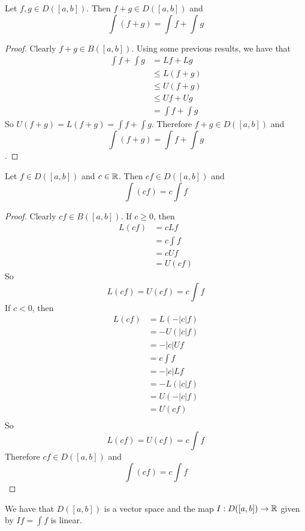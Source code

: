 \documentclass{book}
\begin{document}
	\begin{ex}  
		Let $f, g \in D([a,b])$. Then $f+g \in D([a,b])$ and $$\int (f+g) = \int f + \int g$$
	\end{ex}
	
	\begin{proof}
		Clearly $f+g \in B([a,b])$. Using some previous results, we have that 
		\begin{align*}
			\int f + \int g 
			&= Lf + Lg \\
			&\leq L(f+g) \\
			&\leq U(f+g) \\
			&\leq Uf + Ug \\
			&= \int f + \int g
		\end{align*}
		So $U(f+g) = L(f+g) = \int f + \int g$. Therefore $f+g \in D([a,b])$ and $$\int (f+g) = \int f + \int g$$.
	\end{proof}

	\begin{ex}  
		Let $f \in D([a,b])$ and $c \in \mathbb{R}$. Then $cf \in D([a,b])$ and $$\int (cf) = c \int f $$
	\end{ex}

	\begin{proof}
		Clearly $cf \in B([a,b])$. If $c \geq 0$, then 
		\begin{align*}
			L (cf) 
			&= c Lf \\
			&= c \int f \\
			&= c Uf \\
			&= U(cf)
		\end{align*} 
		So $$L(cf) = U(cf) = c \int f$$ If $c <0$, then 
		\begin{align*}
			L (cf) 
			&= L(-|c| f) \\
			&= -U(|c|f) \\
			&= - |c|Uf \\
			&= c \int f \\
			&= -|c| L f \\
			&= - L(|c|f) \\
			&= U(-|c|f) \\
			&= U (c f) \\
		\end{align*} 
		So $$L(cf) = U(cf) = c \int f$$ Therefore $cf \in D([a,b])$ and $$\int (cf) = c \int f$$
	\end{proof}

	\begin{cor}
		We have that $D([a,b])$ is a vector space and the map $I: D([a,b]) \rightarrow \mathbb{R}$ given by $If = \int f$ is linear.
	\end{cor}
\end{document}
